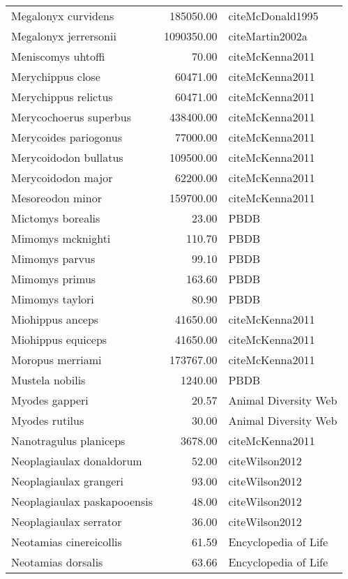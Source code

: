 \begin{table}[ht]
\begin{tabular}{lrl}
  Megalonyx curvidens & 185050.00 & cite{McDonald1995} \\ 
  Megalonyx jerrersonii & 1090350.00 & cite{Martin2002a} \\ 
  Meniscomys uhtoffi & 70.00 & cite{McKenna2011} \\ 
  Merychippus close & 60471.00 & cite{McKenna2011} \\ 
  Merychippus relictus & 60471.00 & cite{McKenna2011} \\ 
  Merycochoerus superbus & 438400.00 & cite{McKenna2011} \\ 
  Merycoides pariogonus & 77000.00 & cite{McKenna2011} \\ 
  Merycoidodon bullatus & 109500.00 & cite{McKenna2011} \\ 
  Merycoidodon major & 62200.00 & cite{McKenna2011} \\ 
  Mesoreodon minor & 159700.00 & cite{McKenna2011} \\ 
  Mictomys borealis & 23.00 & PBDB \\ 
  Mimomys mcknighti & 110.70 & PBDB \\ 
  Mimomys parvus & 99.10 & PBDB \\ 
  Mimomys primus & 163.60 & PBDB \\ 
  Mimomys taylori & 80.90 & PBDB \\ 
  Miohippus anceps & 41650.00 & cite{McKenna2011} \\ 
  Miohippus equiceps & 41650.00 & cite{McKenna2011} \\ 
  Moropus merriami & 173767.00 & cite{McKenna2011} \\ 
  Mustela nobilis & 1240.00 & PBDB \\ 
  Myodes gapperi & 20.57 & Animal Diversity Web \\ 
  Myodes rutilus & 30.00 & Animal Diversity Web \\ 
  Nanotragulus planiceps & 3678.00 & cite{McKenna2011} \\ 
  Neoplagiaulax donaldorum & 52.00 & cite{Wilson2012} \\ 
  Neoplagiaulax grangeri & 93.00 & cite{Wilson2012} \\ 
  Neoplagiaulax paskapooensis & 48.00 & cite{Wilson2012} \\ 
  Neoplagiaulax serrator & 36.00 & cite{Wilson2012} \\ 
  Neotamias cinereicollis & 61.59 & Encyclopedia of Life \\ 
  Neotamias dorsalis & 63.66 & Encyclopedia of Life \\ 

\end{tabular}
\end{table}
